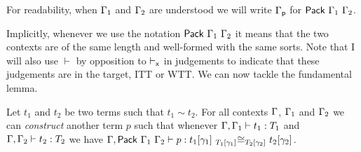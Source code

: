 For readability, when $\Ga_1$ and $\Ga_2$ are understood we will write $\Gp$ for
$\Pack{\Ga_1}{\Ga_2}$.

Implicitly, whenever we use the notation $\Pack{\Ga_1}{\Ga_2}$ it means that
the two contexts are of the same length and well-formed with the same
sorts.
Note that I will also use \(\vdash\) by opposition to \(\vdash_\exmark\) in
judgements to indicate that these judgements are in the target,
\ie \acrshort{ITT} or \acrshort{WTT}.
%
We can now tackle the fundamental lemma.

\begin{lemma}
  Let $t_1$ and $t_2$ be two terms such that \(t_1 \sim t_2\).
  For all contexts \(\Ga\), \(\Ga_1\) and \(\Ga_2\) we can \emph{construct}
  another term \(p\) such that whenever $\isterm{\Ga, \Ga_1}{t_1}{T_1}$ and
  $\isterm{\Ga, \Ga_2}{t_2}{T_2}$ we have
  $\isterm{\Ga, \Pack{\Ga_1}{\Ga_2}}
          {p}
          {\Heq{\llift{\gamma}{}{T_1}}
               {\llift{\gamma}{}{t_1}}
               {\rlift{\gamma}{}{T_2}}
               {\rlift{\gamma}{}{t_2}}}$.
\end{lemma}

